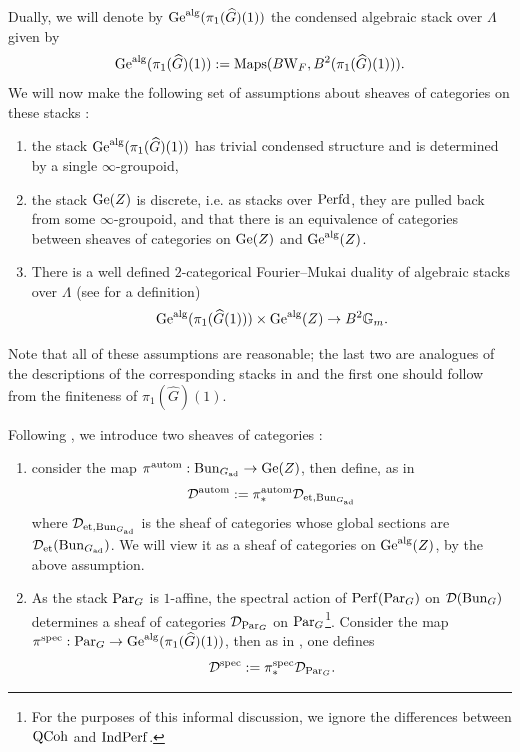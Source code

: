 Dually, we will denote by $\mathrm{Ge}^{\mathrm{alg}}(\pi_1(\widehat{G})(1))$ the condensed algebraic stack over $\Lambda$ given by 
$$\mathrm{Ge}^{\mathrm{alg}}(\pi_1(\widehat{G})(1)) := \mathrm{Maps}(B\mathrm{W}_F, B^2(\pi_1(\widehat{G})(1))).$$
We will now make the following set of assumptions about sheaves of categories on these stacks : 
\begin{enumerate}
    \item the stack $\mathrm{Ge}^{\mathrm{alg}}(\pi_1(\widehat{G})(1))$ has trivial condensed structure and is determined by a single $\infty$-groupoid,
    \item the stack $\mathrm{Ge}(Z)$ is discrete, i.e. as stacks over $\mathrm{Perfd}$, they are pulled back from some $\infty$-groupoid, and that there is an equivalence of categories between sheaves of categories on $\mathrm{Ge}(Z)$ and $\mathrm{Ge}^{\mathrm{alg}}(Z)$.
    \item There is a well defined $2$-categorical Fourier--Mukai duality of algebraic stacks over $\Lambda$ (see \cite[Section 8.1]{GLCV} for a definition) 
    \begin{equation}\label{eq:two-fm-transform}
        \mathrm{Ge}^{\mathrm{alg}}(\pi_1(\widehat{G}(1))) \times \mathrm{Ge}^{\mathrm{alg}}(Z) \to B^2\mathbb{G}_m.
    \end{equation}
\end{enumerate}
Note that all of these assumptions are reasonable; the last two are analogues of the descriptions of the corresponding stacks in \cite[Sections 8.3 and 8.4]{GLCV} and the first one should follow from the finiteness of $\pi_1(\widehat{G})(1)$.

Following \cite{GLCV}, we introduce two sheaves of categories : 
\begin{enumerate}
    \item consider the map $\pi^{\mathrm{autom}} : \mathrm{Bun}_{G_{\mathrm{ad}}} \to \mathrm{Ge}(Z)$, then define, as in \cite[\S 8.6.3]{GLCV}
    $$\mathcal{D}^{\mathrm{autom}} := \pi^{\mathrm{autom}}_*\mathcal{D}_{\mathrm{et},\mathrm{Bun}_{G_{\mathrm{ad}}}}$$
    where $\mathcal{D}_{\mathrm{et},\mathrm{Bun}_{G_{\mathrm{ad}}}}$ is the sheaf of categories whose global sections are $\mathcal{D}_{\mathrm{et}}(\mathrm{Bun}_{G_{\textnormal{ad}}})$. We will view it as a sheaf of categories on $\mathrm{Ge}^{\mathrm{alg}}(Z)$, by the above assumption.
    \item As the stack $\mathrm{Par}_G$ is $1$-affine, the spectral action of $\mathrm{Perf}(\mathrm{Par}_G)$ on $\mathcal{D}(\mathrm{Bun}_G)$ determines a sheaf of categories $\mathcal{D}_{\mathrm{Par}_G}$ on $\mathrm{Par}_G$\footnote{For the purposes of this informal discussion, we ignore the differences between $\mathrm{QCoh}$ and $\mathrm{Ind}\mathrm{Perf}$.}.  Consider the map $\pi^{\mathrm{spec}} : \mathrm{Par}_G \to \mathrm{Ge}^{\mathrm{alg}}(\pi_1(\widehat{G})(1))$, then as in \cite[\S 8.6.6]{GLCV}, one defines 
    $$\mathcal{D}^{\mathrm{spec}} := \pi^{\mathrm{spec}}_*\mathcal{D}_{\mathrm{Par}_G}.$$
\end{enumerate}

